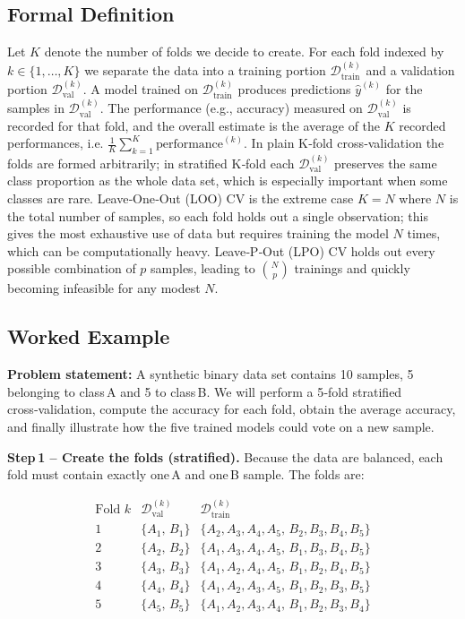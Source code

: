 \documentclass[12pt, a4paper]{article}
\begin{document}
\subsection{Formal Definition}
Let \(K\) denote the number of folds we decide to create.  
For each fold indexed by \(k\in\{1,\dots,K\}\) we separate the data into a training portion \(\mathcal{D}^{(k)}_{\text{train}}\) and a validation portion \(\mathcal{D}^{(k)}_{\text{val}}\).  
A model trained on \(\mathcal{D}^{(k)}_{\text{train}}\) produces predictions \(\hat{y}^{(k)}\) for the samples in \(\mathcal{D}^{(k)}_{\text{val}}\).  
The performance (e.g., accuracy) measured on \(\mathcal{D}^{(k)}_{\text{val}}\) is recorded for that fold, and the overall estimate is the average of the \(K\) recorded performances, i.e. \(\frac{1}{K}\sum_{k=1}^{K}\text{performance}^{(k)}\).  
In plain K‑fold cross‑validation the folds are formed arbitrarily; in stratified K‑fold each \(\mathcal{D}^{(k)}_{\text{val}}\) preserves the same class proportion as the whole data set, which is especially important when some classes are rare.  
Leave‑One‑Out (LOO) CV is the extreme case \(K=N\) where \(N\) is the total number of samples, so each fold holds out a single observation; this gives the most exhaustive use of data but requires training the model \(N\) times, which can be computationally heavy.  
Leave‑P‑Out (LPO) CV holds out every possible combination of \(p\) samples, leading to \(\binom{N}{p}\) trainings and quickly becoming infeasible for any modest \(N\).  

\subsection{Worked Example}
\textbf{Problem statement:}  
A synthetic binary data set contains 10 samples, 5 belonging to class A and 5 to class B.  
We will perform a 5‑fold stratified cross‑validation, compute the accuracy for each fold, obtain the average accuracy, and finally illustrate how the five trained models could vote on a new sample.  

\textbf{Step 1 – Create the folds (stratified).}  
Because the data are balanced, each fold must contain exactly one A and one B sample.  
The folds are:  

\[
\begin{array}{c|c|c}
\text{Fold }k & \mathcal{D}^{(k)}_{\text{val}} & \mathcal{D}^{(k)}_{\text{train}} \\
\hline
1 & \{A_1,\,B_1\} & \{A_2,A_3,A_4,A_5,\,B_2,B_3,B_4,B_5\}\\
2 & \{A_2,\,B_2\} & \{A_1,A_3,A_4,A_5,\,B_1,B_3,B_4,B_5\}\\
3 & \{A_3,\,B_3\} & \{A_1,A_2,A_4,A_5,\,B_1,B_2,B_4,B_5\}\\
4 & \{A_4,\,B_4\} & \{A_1,A_2,A_3,A_5,\,B_1,B_2,B_3,B_5\}\\
5 & \{A_5,\,B_5\} & \{A_1,A_2,A_3,A_4,\,B_1,B_2,B_3,B_4\}
\end{array}
\]
\end{document}
